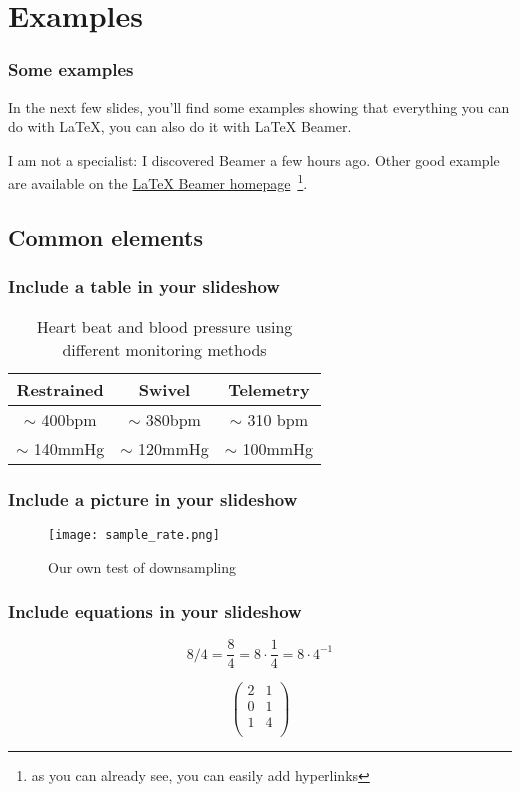 \documentclass{beamer}
\begin{document}
\section{Examples}

\frame
{
	\frametitle{Some examples}

	In the next few slides, you'll find some examples showing that everything you can do with LaTeX, you can also do it with LaTeX Beamer.

	I am not a specialist: I discovered Beamer a few hours ago. Other good example are available on the \href{http://latex-beamer.sourceforge.net/}{LaTeX Beamer homepage}~\footnote{as you can already see, you can easily add hyperlinks}.
}

\subsection{Common elements}

\frame
{
	\frametitle{Include a table in your slideshow}
	
	\begin{table}
	\centering
	\begin{tabular}{|c|c|c|} \hline \hline
	Restrained     & Swivel         & Telemetry      \\ \hline \hline
	$\sim$ 400bpm  & $\sim$ 380bpm  & $\sim$ 310 bpm \\
	$\sim$ 140mmHg & $\sim$ 120mmHg & $\sim$ 100mmHg \\ \hline \hline
	\end{tabular}
	\caption{Heart beat and blood pressure using different monitoring methods}
	\label{tbl:kramer}
	\end{table}
}

\frame
{
	\frametitle{Include a picture in your slideshow}
	
	\begin{figure}
	\centering
	\texttt{[image: sample\_rate.png]}
	\caption{Our own test of downsampling}
	\label{fig:test_down_sampling}
	\end{figure}
}

\frame
{
	\frametitle{Include equations in your slideshow}

	\[8 / 4 = \frac{8}{4} = 8 \cdot \frac{1}{4} = 8 \cdot 4^{-1}\]
	
	\[\left( \begin{array}{cc}
	2 & 1 \\
	0 & 1 \\
	1 & 4 \\
	\end{array} \right)\]
}
\end{document}
